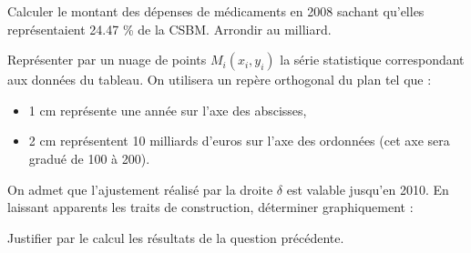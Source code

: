 \begin{questions}
	
	\question[1] Calculer le montant des dépenses de médicaments en 2008 sachant qu'elles représentaient \num{24.47}  \% de la CSBM. Arrondir au milliard.
	
	\question[2] Représenter par un nuage de points $M_i(x_i, y_i)$ la série statistique correspondant aux données du tableau. On utilisera un repère orthogonal du plan tel que :
	\begin{itemize}
		\item 1 cm représente une année sur l'axe des abscisses,
		
		\item 2 cm représentent 10 milliards d'euros sur l'axe des ordonnées (cet axe sera gradué de 100 à 200).
		
	\end{itemize}

	\question[4] 
	
		\question[2] On admet que l'ajustement réalisé par la droite $\delta$ est valable jusqu'en 2010. En laissant apparents les traits de construction, déterminer graphiquement :
		
		\question[2] Justifier par le calcul les résultats de la question précédente.
\end{questions}